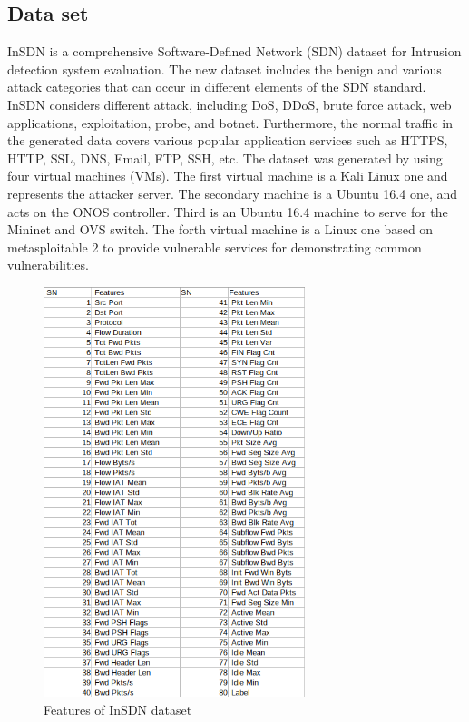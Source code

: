 \subsection{Data set}
\vspace{-18pt}
InSDN is a comprehensive Software-Defined Network (SDN) dataset for Intrusion detection system evaluation. The new dataset includes the benign and various attack categories  that can occur in different elements of the SDN standard. InSDN considers different attack, including DoS, DDoS, brute force attack, web applications, exploitation, probe, and botnet. Furthermore, the normal traffic in the generated data covers  various  popular  application services such as HTTPS, HTTP, SSL, DNS, Email, FTP, SSH, etc. The dataset was generated by using four virtual machines (VMs). The first virtual machine is a Kali Linux one and represents the attacker server. The secondary machine is a Ubuntu 16.4 one, and acts on the ONOS controller. Third is an Ubuntu 16.4 machine to serve for the Mininet and OVS switch. The forth virtual machine is a Linux one based on metasploitable 2 to provide vulnerable services for demonstrating common vulnerabilities.\cite{article}
\begin{figure}[h] %
\begin{center}
	\includegraphics[width=3in]{images/ds2.png} 
	\caption{Features of InSDN dataset} %
	\label{} %
\end{center}
\end{figure}
